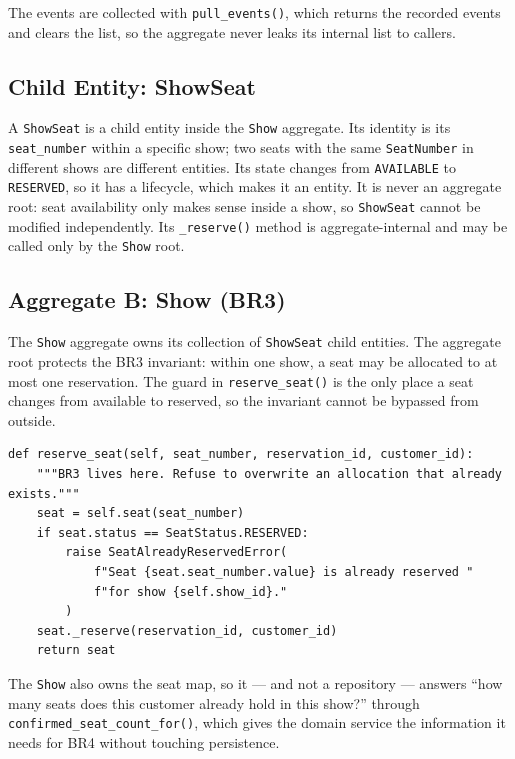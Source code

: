 \documentclass[11pt,a4paper]{article}
\newcommand{\code}[1]{\texttt{#1}}
\begin{document}
The events are collected with \code{pull\_events()}, which returns the recorded
events and clears the list, so the aggregate never leaks its internal list to
callers.

\subsection{Child Entity: ShowSeat}

A \code{ShowSeat} is a child entity inside the \code{Show} aggregate. Its
identity is its \code{seat\_number} within a specific show; two seats with the
same \code{SeatNumber} in different shows are different entities. Its state
changes from \code{AVAILABLE} to \code{RESERVED}, so it has a lifecycle, which
makes it an entity. It is never an aggregate root: seat availability only makes
sense inside a show, so \code{ShowSeat} cannot be modified independently. Its
\code{\_reserve()} method is aggregate-internal and may be called only by the
\code{Show} root.

\subsection{Aggregate B: Show (BR3)}

The \code{Show} aggregate owns its collection of \code{ShowSeat} child
entities. The aggregate root protects the BR3 invariant: within one show, a
seat may be allocated to at most one reservation. The guard in
\code{reserve\_seat()} is the only place a seat changes from available to
reserved, so the invariant cannot be bypassed from outside.

\begin{lstlisting}[style=python,caption={\code{Show.reserve\_seat()}\ --- BR3 invariant enforced at the aggregate root.},label=lst:br3]
def reserve_seat(self, seat_number, reservation_id, customer_id):
    """BR3 lives here. Refuse to overwrite an allocation that already exists."""
    seat = self.seat(seat_number)
    if seat.status == SeatStatus.RESERVED:
        raise SeatAlreadyReservedError(
            f"Seat {seat.seat_number.value} is already reserved "
            f"for show {self.show_id}."
        )
    seat._reserve(reservation_id, customer_id)
    return seat
\end{lstlisting}

The \code{Show} also owns the seat map, so it --- and not a repository ---
answers ``how many seats does this customer already hold in this show?''
through \code{confirmed\_seat\_count\_for()}, which gives the domain service
the information it needs for BR4 without touching persistence.
\end{document}
